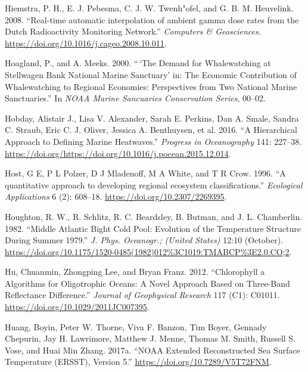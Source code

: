 \documentclass[
]{book}
\newlength{\cslhangindent}
\newenvironment{cslreferences}%
  {\setlength{\parindent}{0pt}%
  \everypar{\setlength{\hangindent}{\cslhangindent}}\ignorespaces}%
  {\par}
\begin{document}
\begin{cslreferences}
\leavevmode\hypertarget{ref-automap}{}%
Hiemstra, P. H., E. J. Pebesma, C. J. W. Twenh"ofel, and G. B. M. Heuvelink. 2008. ``Real-time automatic interpolation of ambient gamma dose rates from the Dutch Radioactivity Monitoring Network.'' \emph{Computers \& Geosciences}. \url{https://doi.org/10.1016/j.cageo.2008.10.011}.

\leavevmode\hypertarget{ref-hoagland_demand_2000}{}%
Hoagland, P., and A. Meeks. 2000. ``\,`The Demand for Whalewatching at Stellwagen Bank National Marine Sanctuary' in: The Economic Contribution of Whalewatching to Regional Economies: Perspectives from Two National Marine Sanctuaries.'' In \emph{NOAA Marine Sancuaries Conservation Series}, 00--02.

\leavevmode\hypertarget{ref-hobday2016}{}%
Hobday, Alistair J., Lisa V. Alexander, Sarah E. Perkins, Dan A. Smale, Sandra C. Straub, Eric C. J. Oliver, Jessica A. Benthuysen, et al. 2016. ``A Hierarchical Approach to Defining Marine Heatwaves.'' \emph{Progress in Oceanography} 141: 227--38. \url{https://doi.org/https://doi.org/10.1016/j.pocean.2015.12.014}.

\leavevmode\hypertarget{ref-Host1996}{}%
Host, G E, P L Polzer, D J Mladenoff, M A White, and T R Crow. 1996. ``A quantitative approach to developing regional ecosystem classifications.'' \emph{Ecological Applications} 6 (2): 608--18. \url{https://doi.org/10.2307/2269395}.

\leavevmode\hypertarget{ref-houghton_middle_1982}{}%
Houghton, R. W., R. Schlitz, R. C. Beardsley, B. Butman, and J. L. Chamberlin. 1982. ``Middle Atlantic Bight Cold Pool: Evolution of the Temperature Structure During Summer 1979.'' \emph{J. Phys. Oceanogr.; (United States)} 12:10 (October). \url{https://doi.org/10.1175/1520-0485(1982)012\%3C1019:TMABCP\%3E2.0.CO;2}.

\leavevmode\hypertarget{ref-SOE5}{}%
Hu, Chuanmin, Zhongping Lee, and Bryan Franz. 2012. ``Chlorophyll a Algorithms for Oligotrophic Oceans: A Novel Approach Based on Three-Band Reflectance Difference.'' \emph{Journal of Geophysical Research} 117 (C1): C01011. \url{https://doi.org/10.1029/2011JC007395}.

\leavevmode\hypertarget{ref-Huang2017}{}%
Huang, Boyin, Peter W. Thorne, Viva F. Banzon, Tim Boyer, Gennady Chepurin, Jay H. Lawrimore, Matthew J. Menne, Thomas M. Smith, Russell S. Vose, and Huai Min Zhang. 2017a. ``NOAA Extended Reconstructed Sea Surface Temperature (ERSST), Version 5.'' \url{https://doi.org/10.7289/V5T72FNM}.


\end{cslreferences}
\end{document}
